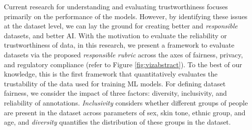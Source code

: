 \documentclass[journal]{IEEEtran}
\begin{document}
Current research for understanding and evaluating trustworthiness focuses primarily on the performance of the models. However, by identifying these issues at the dataset level, we can lay the ground for creating better and \textit{responsible} datasets, and better AI. With the motivation to evaluate the reliability or trustworthiness of data, in this research, we present a framework to evaluate datasets via the proposed \textit{responsible rubric} across the axes of fairness, privacy, and regulatory compliance (refer to Figure \ref{fig:vizabstract}).
To the best of our knowledge, this is the first framework that quantitatively evaluates the trustability of the data used for training ML models. For defining dataset fairness, we consider the impact of three factors: diversity, inclusivity, and reliability of annotations. \textit{Inclusivity} considers whether different groups of people are present in the dataset across parameters of sex, skin tone, ethnic group, and age, and \textit{diversity} quantifies the distribution of these groups in the dataset.  
\end{document}
